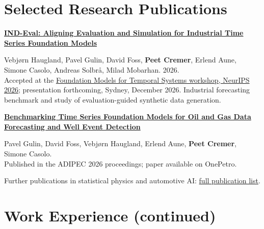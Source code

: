\documentclass[singlesided,
               paper=a4,
               fontsize=10pt
              ]{my-resume}
\begin{document}
\section[\faBook]{Selected Research Publications}
\textbf{\href{https://arxiv.org/abs/2610.16652}{IND-Eval: Aligning Evaluation and Simulation for Industrial Time Series Foundation Models}}\\
{\small Vebjørn Haugland, Pavel Gulin, David Foss, \textbf{Peet Cremer}, Erlend Aune, Simone Casolo, Andreas Solbrå, Milad Mobarhan. 2026.\\
Accepted at the \href{https://fmts-workshop.github.io/}{Foundation Models for Temporal Systems workshop, NeurIPS 2026}; presentation forthcoming, Sydney, December 2026. Industrial forecasting benchmark and study of evaluation-guided synthetic data generation.\par}
\medskip
\textbf{\href{https://onepetro.org/SPEADIP/proceedings-abstract/26ADIP/26ADIP/D021S045R003/810160}{Benchmarking Time Series Foundation Models for Oil and Gas Data Forecasting and Well Event Detection}}\\
{\small Pavel Gulin, David Foss, Vebjørn Haugland, Erlend Aune, \textbf{Peet Cremer}, Simone Casolo.\\
Published in the ADIPEC 2026 proceedings; paper available on OnePetro.\par}
\medskip
{\small Further publications in statistical physics and automotive AI: \href{https://scholar.google.com/citations?hl=de&user=MnU8ZxwAAAAJ}{full publication list}.\par}

\clearpage
\pagestyle{empty}
\section[\faBriefcase]{Work Experience (continued)}
\end{document}
